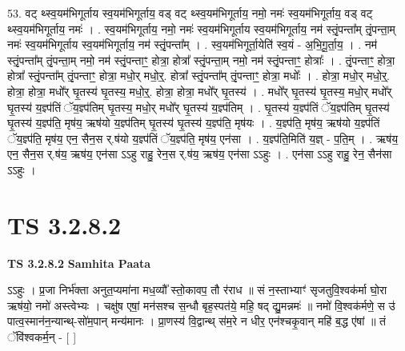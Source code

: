 \documentclass[17pt]{extarticle}
\begin{document}
53. वट् थ्स्व॒यम॑भिगूर्ताय स्व॒यम॑भिगूर्ताय॒ वड् वट् थ्स्व॒यम॑भिगूर्ताय॒ नमो॒ नमः॑ स्व॒यम॑भिगूर्ताय॒ वड् वट् थ्स्व॒यम॑भिगूर्ताय॒ नमः॑ । . स्व॒यम॑भिगूर्ताय॒ नमो॒ नमः॑ स्व॒यम॑भिगूर्ताय स्व॒यम॑भिगूर्ताय॒ नम॑ स्तृं॒पन्ता᳚म् तृं॒पन्ता॒म् नमः॑ स्व॒यम॑भिगूर्ताय स्व॒यम॑भिगूर्ताय॒ नम॑ स्तृं॒पन्ता᳚म् । . स्व॒यम॑भिगूर्ता॒येति॑ स्व॒यं - अ॒भि॒गू॒र्ता॒य॒ । . नम॑ स्तृं॒पन्ता᳚म् तृं॒पन्ता॒म् नमो॒ नम॑ स्तृं॒पन्ताꣳ॒॒ होत्रा॒ होत्रा᳚ स्तृं॒पन्ता॒म् नमो॒ नम॑ स्तृं॒पन्ताꣳ॒॒ होत्राः᳚ । . तृं॒पन्ताꣳ॒॒ होत्रा॒ होत्रा᳚ स्तृं॒पन्ता᳚म् तृं॒पन्ताꣳ॒॒ होत्रा॒ मधो॒र् मधो॒र्॒. होत्रा᳚ स्तृं॒पन्ता᳚म् तृं॒पन्ताꣳ॒॒ होत्रा॒ मधोः᳚ । . होत्रा॒ मधो॒र् मधो॒र्॒. होत्रा॒ होत्रा॒ मधो᳚र् घृ॒तस्य॑ घृ॒तस्य॒ मधो॒र्॒. होत्रा॒ होत्रा॒ मधो᳚र् घृ॒तस्य॑ । . मधो᳚र् घृ॒तस्य॑ घृ॒तस्य॒ मधो॒र् मधो᳚र् घृ॒तस्य॑ य॒ज्ञ्प॑तिं ॅय॒ज्ञ्प॑तिम् घृ॒तस्य॒ मधो॒र् मधो᳚र् घृ॒तस्य॑ य॒ज्ञ्प॑तिम् । . घृ॒तस्य॑ य॒ज्ञ्प॑तिं ॅय॒ज्ञ्प॑तिम् घृ॒तस्य॑ घृ॒तस्य॑ य॒ज्ञ्प॑ति॒ मृष॑य॒ ऋष॑यो य॒ज्ञ्प॑तिम् घृ॒तस्य॑ घृ॒तस्य॑ य॒ज्ञ्प॑ति॒ मृष॑यः । . य॒ज्ञ्प॑ति॒ मृष॑य॒ ऋष॑यो य॒ज्ञ्प॑तिं ॅय॒ज्ञ्प॑ति॒ मृष॑य॒ एन॒ सैन॒स र्.ष॑यो य॒ज्ञ्प॑तिं ॅय॒ज्ञ्प॑ति॒ मृष॑य॒ एन॑सा । . य॒ज्ञ्प॑ति॒मिति॑ य॒ज्ञ् - प॒ति॒म् । . ऋष॑य॒ एन॒ सैन॒स र्.ष॑य॒ ऋष॑य॒ एन॑सा ऽऽहु राहु॒ रेन॒स र्.ष॑य॒ ऋष॑य॒ एन॑सा ऽऽहुः । . एन॑सा ऽऽहु राहु॒ रेन॒ सैन॑सा ऽऽहुः । \newline
\pagebreak
{}

\section{ TS 3.2.8.2 }

\textbf{TS 3.2.8.2 } \newline
\textbf{Samhita Paata} \newline

ऽऽहुः । प्र॒जा निर्भ॑क्ता अनुत॒प्यमा॑ना मध॒व्यौ᳚ स्तो॒कावप॒ तौ र॑राध ॥ सं न॒स्ताभ्याꣳ॑ सृजतुवि॒श्वक॑र्मा घो॒रा ऋष॑यो॒ नमो॑ अस्त्वेभ्यः । चक्षु॑ष एषां॒ मन॑सश्च स॒न्धौ बृह॒स्पत॑ये॒ महि॒ षद् द्यु॒मन्नमः॑ ॥ नमो॑ वि॒श्वक॑र्मणे॒ स उ॑ पात्व॒स्मान॑न॒न्यान्थ्-सो॑म॒पान् मन्य॑मानः । प्रा॒णस्य॑ वि॒द्वान्थ् स॑म॒रे न धीर॒ एन॑श्चकृ॒वान् महि॑ ब॒द्ध ए॑षां ॥ तं ॅवि॑श्वकर्म॒न् - [  ] \newline
\end{document}
